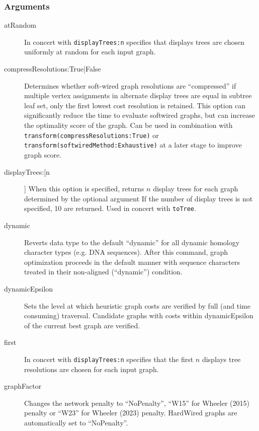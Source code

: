 	\subsubsection{Arguments}
		\begin{description}
			\item[atRandom] In concert with \texttt{displayTrees:n} specifies that displays trees are chosen 
			uniformly at random for each input graph.
			
			\item[compressResolutions:True|False] %
			Determines whether soft-wired graph 
			resolutions are ``compressed'' if multiple vertex assignments in alternate display 
			trees are equal in subtree leaf set, only the first lowest cost resolution is retained.
			This option can significantly reduce the time to evaluate softwired graphs, but can
			increase the optimality score of the graph.  Can be used in combination with
			\texttt{transform(compressResolutions:True)} or \texttt{transform(softwiredMethod:Exhaustive)} 
			at a later stage to improve graph score.
			
			\item[displayTrees:[n]] When this option is specified, returns $n$ display trees for each graph 
			determined by the optional argument If the number of display trees is not 
			specified, 10 are returned. Used in concert with \texttt{toTree}.
			
			\item[dynamic] Reverts data type to the default ``dynamic'' for all dynamic homology 
			\citep{Wheeler2001} character types (e.g. DNA sequences). After this command, 
			graph optimization proceeds in the default manner with sequence characters treated 
			in their non-aligned (``dynamic'') condition.
			
			\item[dynamicEpsilon] Sets the level at which heuristic graph costs are verified by full (and time consuming) traversal.  
			Candidate graphs with costs within dynamicEpsilon of the current best graph are verified.
			
			\item[first] In concert with \texttt{displayTrees:n} specifies that the first $n$ displays tree 
			resolutions are chosen for each input graph.
			
			\item[graphFactor] Changes the network penalty to ``NoPenalty'', ``W15'' for Wheeler (2015) penalty or
			``W23'' for Wheeler (2023) penalty.  HardWired graphs are automatically set to ``NoPenalty''.
			

\end{description}
